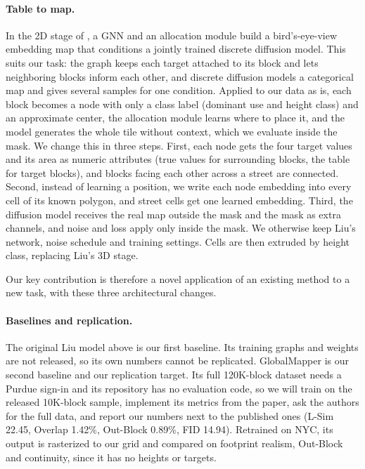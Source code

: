 \documentclass[twocolumn,11pt]{article}
\begin{document}
\paragraph{Table to map.} In the 2D stage of \citet{liu2025controllable}, a GNN and an allocation module build a bird's-eye-view embedding map that conditions a jointly trained discrete diffusion model. This suits our task: the graph keeps each target attached to its block and lets neighboring blocks inform each other, and discrete diffusion models a categorical map and gives several samples for one condition. Applied to our data as is, each block becomes a node with only a class label (dominant use and height class) and an approximate center, the allocation module learns where to place it, and the model generates the whole tile without context, which we evaluate inside the mask. We change this in three steps. First, each node gets the four target values and its area as numeric attributes (true values for surrounding blocks, the table for target blocks), and blocks facing each other across a street are connected. Second, instead of learning a position, we write each node embedding into every cell of its known polygon, and street cells get one learned embedding. Third, the diffusion model receives the real map outside the mask and the mask as extra channels, and noise and loss apply only inside the mask. We otherwise keep Liu's network, noise schedule and training settings. Cells are then extruded by height class, replacing Liu's 3D stage.

Our key contribution is therefore a novel application of an existing method to a new task, with these three architectural changes.

\paragraph{Baselines and replication.} The original Liu model above is our first baseline. Its training graphs and weights are not released, so its own numbers cannot be replicated. GlobalMapper is our second baseline and our replication target. Its full 120K-block dataset needs a Purdue sign-in and its repository has no evaluation code, so we will train on the released 10K-block sample, implement its metrics from the paper, ask the authors for the full data, and report our numbers next to the published ones (L-Sim 22.45, Overlap 1.42\%, Out-Block 0.89\%, FID 14.94). Retrained on NYC, its output is rasterized to our grid and compared on footprint realism, Out-Block and continuity, since it has no heights or targets.
\end{document}
